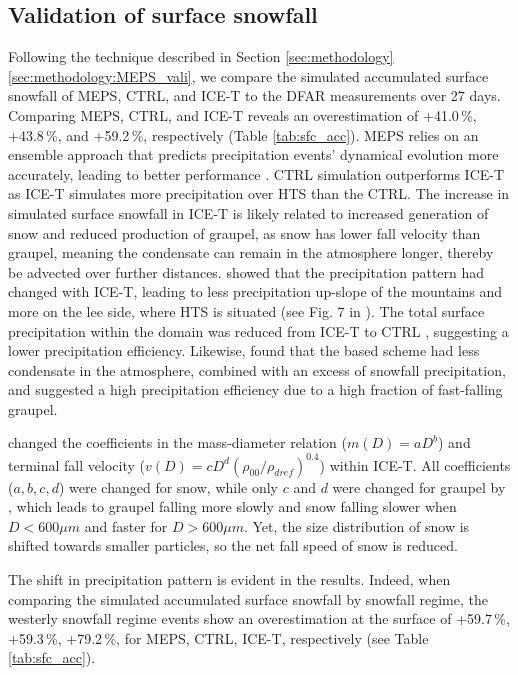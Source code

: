 \documentclass{ametsocV5}
\begin{document}
	\subsection{Validation of surface snowfall}\label{sec:res:season_sfc}
		Following the technique described in Section \ref{sec:methodology}\ref{sec:methodology:MEPS_vali}, we compare the simulated accumulated surface snowfall of MEPS, CTRL, and ICE-T to the DFAR measurements over 27 days. Comparing MEPS, CTRL, and ICE-T reveals an overestimation of +41.0\,\%, +43.8\,\%, and +59.2\,\%, respectively (Table \ref{tab:sfc_acc}). MEPS relies on an ensemble approach that predicts precipitation events' dynamical evolution more accurately, leading to better performance \citep{frogner_convection-permitting_2019}. CTRL simulation outperforms ICE-T as ICE-T simulates more precipitation over HTS than the CTRL. The increase in simulated surface snowfall in ICE-T is likely related to increased generation of snow and reduced production of graupel, as snow has lower fall velocity than graupel, meaning the condensate can remain in the atmosphere longer, thereby be advected over further distances. \cite{engdahl_effects_2020} showed that the precipitation pattern had changed with ICE-T, leading to less precipitation up-slope of the mountains and more on the lee side, where HTS is situated (see Fig. 7 in \citet{engdahl_effects_2020}). The total surface precipitation within the domain was reduced from ICE-T to CTRL \citep{engdahl_effects_2020}, suggesting a lower precipitation efficiency. Likewise, \citet{liu_high-resolution_2011} found that the \citet{lin_bulk_1983} based scheme had less condensate in the atmosphere, combined with an excess of snowfall precipitation, and suggested a high precipitation efficiency due to a high fraction of fast-falling graupel.

		
		\citet{engdahl_improving_2020} changed the coefficients in the mass-diameter relation ($m(D) = aD^b$) and terminal fall velocity ($v(D) = cD^d (\rho_{00}/\rho_{dref})^{0.4}$) within ICE-T. All coefficients ($a, b, c, d$) were changed for snow, while only $c$ and $d$ were changed for graupel by \citet{engdahl_improving_2020}, which leads to graupel falling more slowly and snow falling slower when $D < 600\mu m$ and faster for $D > 600\mu m$. Yet, the size distribution of snow is shifted towards smaller particles, so the net fall speed of snow is reduced. 
		
		The shift in precipitation pattern is evident in the results. Indeed, when comparing the simulated accumulated surface snowfall by snowfall regime, the westerly snowfall regime events show an overestimation at the surface of +59.7\,\%, +59.3\,\%, +79.2\,\%, for MEPS, CTRL, ICE-T, respectively (see Table \ref{tab:sfc_acc}). 
		
\end{document}
